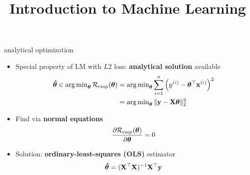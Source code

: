 \documentclass[11pt,compress,t,notes=noshow, xcolor=table]{beamer}
\title{Introduction to Machine Learning}
\institute{\href{https://compstat-lmu.github.io/lecture_i2ml/}{compstat-lmu.github.io/lecture\_i2ml}}
\date{}
\begin{document}


\begin{vbframe}{analytical optimization}

\begin{itemize}
    \item Special property of LM with $L2$ loss: \textbf{analytical solution}
    available
    \begin{align*}
        \bm{\hat\theta} \in 
        \operatorname{arg\,min}_{\bm{\theta}} \mathcal{R}_{\text{emp}}(\bm{\theta}) &=
        \operatorname{arg\,min}_{\bm{\theta}} \sum\limits_{i=1}^n \left(y^{(i)} - \bm{\theta}^\top \mathbf{x}^{(i)} \right)^2  \\
        &= \operatorname{arg\,min}_{\bm{\theta}} \| \mathbf{y} - \mathbf{X} \bm{\theta} \|^2_2
    \end{align*}
    \normalsize
    \item Find via \textbf{normal equations}
    $$\frac{\partial{\mathcal{R}_{\text{emp}}(\bm{\theta})}}{\partial \bm{\theta}} = 0$$
    \item Solution: \textbf{ordinary-least-squares (OLS)} estimator
    $$\bm{\hat\theta} = (\mathbf{X}^\top \mathbf{X})^{-1} \mathbf{X}^\top \mathbf{y}$$
\end{itemize}

\end{vbframe}

\end{document}
